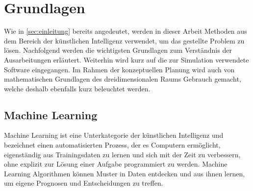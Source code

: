 \chapter{Grundlagen}
Wie in \autoref{sec:einleitung} bereits angedeutet, werden in dieser Arbeit Methoden aus dem Bereich der künstlichen Intelligenz verwendet, um das gestellte Problem zu lösen.
Nachfolgend werden die wichtigsten Grundlagen zum Verständnis der Ausarbeitungen erläutert.
Weiterhin wird kurz auf die zur Simulation verwendete Software eingegangen.
Im Rahmen der konzeptuellen Planung wird auch von mathematischen Grundlagen des dreidimensionalen Raums Gebrauch gemacht, welche deshalb ebenfalls kurz beleuchtet werden.

\section{Machine Learning}
Machine Learning ist eine Unterkategorie der künstlichen Intelligenz und bezeichnet einen automatisierten Prozess, der es Computern ermöglicht, eigenständig aus Trainingsdaten zu lernen und sich mit der Zeit zu verbessern, ohne explizit zur Lösung einer Aufgabe programmiert zu werden.
Machine Learning Algorithmen können Muster in Daten entdecken und aus ihnen lernen, um eigene Prognosen und Entscheidungen zu treffen.

